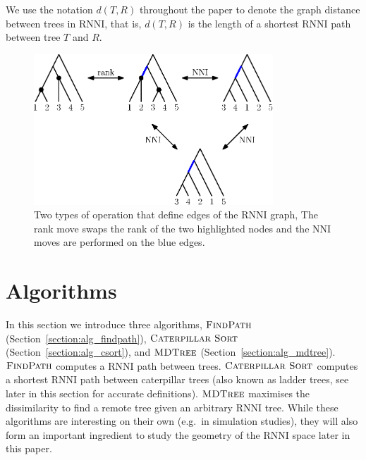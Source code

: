 \documentclass{amsart}
\newcommand{\nni}{\mathrm{NNI}}
\newcommand{\rnni}{\mathrm{RNNI}}
\newcommand{\csort}{\textsc{Caterpillar Sort}}
\newcommand{\findpath}{\textsc{FindPath}}
\newcommand{\mdtree}{\textsc{MDTree}}
\begin{document}
We use the notation $d(T, R)$ throughout the paper to denote the graph distance between trees in $\rnni$, that is, $d(T, R)$ is the length of a shortest $\rnni$ path between tree $T$ and $R$.

\begin{figure}[H]
\centering
\includegraphics[width=0.8\textwidth]{RNNI}
\vspace{12pt}
\caption{Two types of operation that define edges of the $\rnni$ graph,
The rank move swaps the rank of the two highlighted nodes and the $\nni$ moves are performed on the blue edges.}
\label{fig:RNNI}
\end{figure}



\section{Algorithms}
\label{section:algorithms}

In this section we introduce three algorithms, $\findpath$ (Section~\ref{section:alg_findpath}), $\csort$ (Section~\ref{section:alg_csort}), and $\mdtree$ (Section~\ref{section:alg_mdtree}).
$\findpath$ computes a $\rnni$ path between trees.
$\csort$ computes a shortest $\rnni$ path between caterpillar trees (also known as ladder trees, see later in this section for accurate definitions).
$\mdtree$ maximises the dissimilarity to find a remote tree given an arbitrary $\rnni$ tree.
While these algorithms are interesting on their own (e.g.\ in simulation studies), they will also form an important ingredient to study the geometry of the $\rnni$ space later in this paper.
\end{document}

